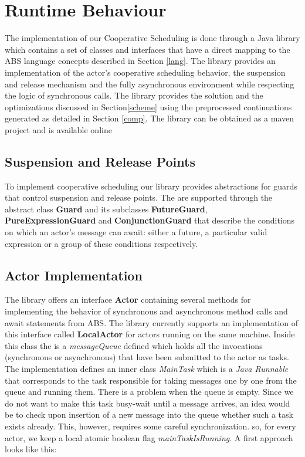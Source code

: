 \section{Runtime Behaviour}
\label{run}
The implementation of our Cooperative Scheduling is done through a Java library which contains a set of classes and interfaces that have a direct mapping to the ABS language concepts described in Section \ref{lang}. The library provides an implementation of the actor's cooperative scheduling behavior, the suspension and release mechanism and the fully asynchronous environment while respecting the logic of synchronous calls. The library provides the solution and the optimizations discussed in Section\ref{scheme} using the preprocessed continuations generated as detailed in Section \ref{comp}. The library can be obtained as a maven project and is available online\cite{library}

\subsection{Suspension and Release Points}
To implement cooperative scheduling our library provides abstractions for guards that control suspension and release points. The are supported through the abstract class \textbf{Guard} and its subclasses \textbf{FutureGuard}, \textbf{PureExpressionGuard} and \textbf{ConjunctionGuard} that describe the conditions on which an actor's message can await: either a future, a particular valid expression or a group of these conditions respectively. 

\subsection{Actor Implementation}
The library offers an interface \textbf{Actor} containing several methods for implementing the behavior of synchronous and asynchronous method calls and await statements from ABS. The library currently supports an implementation of this interface called \textbf{LocalActor} for actors running on the same machine. Inside this class the is a \textit{messageQueue} defined which holds all the invocations (synchronous or asynchronous) that have been submitted to the actor as tasks. The implementation defines an inner class \textit{MainTask} which is a \textit{Java Runnable} that corresponds to the task responsible for taking messages one by one from the queue and running them. There is a problem when the queue is empty. Since we do not want to make this task busy-wait until a message arrives, an idea would be to check upon insertion of a new message into the queue whether such a task exists already. This, however, requires some careful synchronization. so, for every actor, we keep a local atomic boolean flag \textit{mainTaskIsRunning}. A first approach looks like this:

